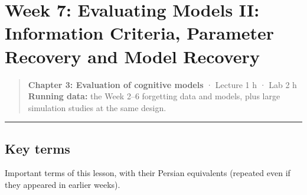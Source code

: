 \section{Week 7: Evaluating Models II: Information Criteria, Parameter
Recovery and Model Recovery}

\begin{quote}
\textbf{Chapter 3: Evaluation of cognitive models} · Lecture 1 h · Lab 2
h \textbf{Running data:} the Week 2--6 forgetting data and models, plus
large simulation studies at the same design.
\end{quote}

\begin{center}\rule{0.5\linewidth}{0.5pt}\end{center}

\subsection{Key terms}

Important terms of this lesson, with their Persian equivalents (repeated
even if they appeared in earlier weeks).


